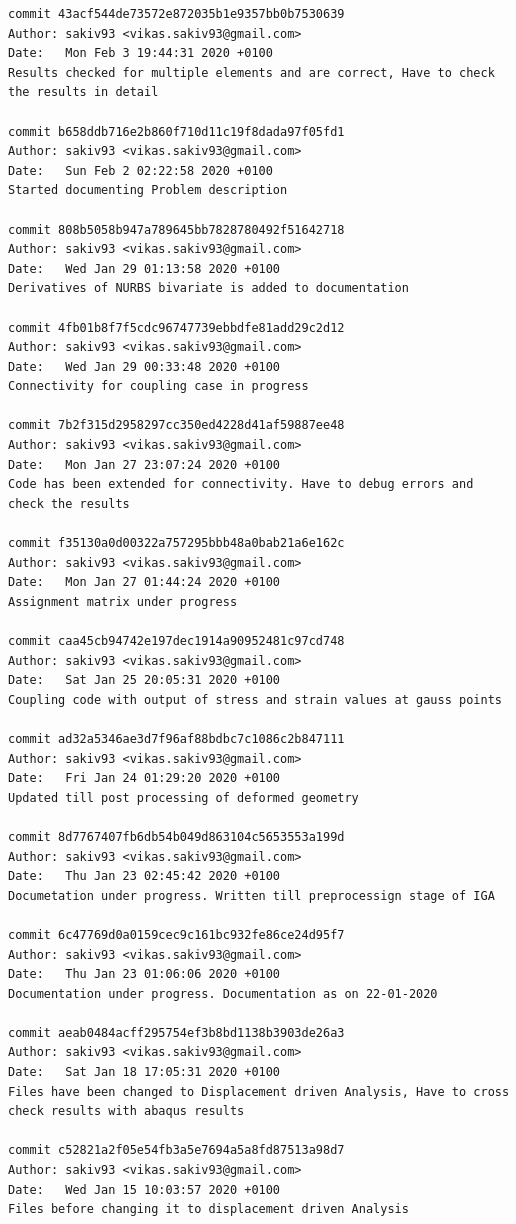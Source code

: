 \documentclass[11pt]{article}
\begin{document}
\begin{Verbatim}[breaklines=true]
commit 43acf544de73572e872035b1e9357bb0b7530639
Author: sakiv93 <vikas.sakiv93@gmail.com>
Date:   Mon Feb 3 19:44:31 2020 +0100
Results checked for multiple elements and are correct, Have to check the results in detail

commit b658ddb716e2b860f710d11c19f8dada97f05fd1
Author: sakiv93 <vikas.sakiv93@gmail.com>
Date:   Sun Feb 2 02:22:58 2020 +0100
Started documenting Problem description

commit 808b5058b947a789645bb7828780492f51642718
Author: sakiv93 <vikas.sakiv93@gmail.com>
Date:   Wed Jan 29 01:13:58 2020 +0100
Derivatives of NURBS bivariate is added to documentation

commit 4fb01b8f7f5cdc96747739ebbdfe81add29c2d12
Author: sakiv93 <vikas.sakiv93@gmail.com>
Date:   Wed Jan 29 00:33:48 2020 +0100
Connectivity for coupling case in progress

commit 7b2f315d2958297cc350ed4228d41af59887ee48
Author: sakiv93 <vikas.sakiv93@gmail.com>
Date:   Mon Jan 27 23:07:24 2020 +0100
Code has been extended for connectivity. Have to debug errors and check the results

commit f35130a0d00322a757295bbb48a0bab21a6e162c
Author: sakiv93 <vikas.sakiv93@gmail.com>
Date:   Mon Jan 27 01:44:24 2020 +0100
Assignment matrix under progress

commit caa45cb94742e197dec1914a90952481c97cd748
Author: sakiv93 <vikas.sakiv93@gmail.com>
Date:   Sat Jan 25 20:05:31 2020 +0100
Coupling code with output of stress and strain values at gauss points

commit ad32a5346ae3d7f96af88bdbc7c1086c2b847111
Author: sakiv93 <vikas.sakiv93@gmail.com>
Date:   Fri Jan 24 01:29:20 2020 +0100
Updated till post processing of deformed geometry

commit 8d7767407fb6db54b049d863104c5653553a199d
Author: sakiv93 <vikas.sakiv93@gmail.com>
Date:   Thu Jan 23 02:45:42 2020 +0100
Documetation under progress. Written till preprocessign stage of IGA

commit 6c47769d0a0159cec9c161bc932fe86ce24d95f7
Author: sakiv93 <vikas.sakiv93@gmail.com>
Date:   Thu Jan 23 01:06:06 2020 +0100
Documentation under progress. Documentation as on 22-01-2020

commit aeab0484acff295754ef3b8bd1138b3903de26a3
Author: sakiv93 <vikas.sakiv93@gmail.com>
Date:   Sat Jan 18 17:05:31 2020 +0100
Files have been changed to Displacement driven Analysis, Have to cross check results with abaqus results

commit c52821a2f05e54fb3a5e7694a5a8fd87513a98d7
Author: sakiv93 <vikas.sakiv93@gmail.com>
Date:   Wed Jan 15 10:03:57 2020 +0100
Files before changing it to displacement driven Analysis


\end{Verbatim}
\end{document}
